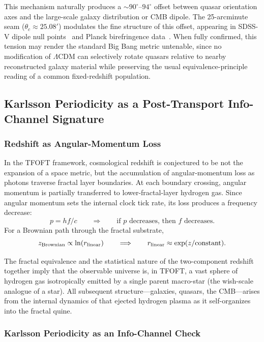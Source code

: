 \documentclass[11pt,a4paper]{article}
\begin{document}
This mechanism naturally produces a $\sim90^\circ$--$94^\circ$ offset between quasar orientation axes and the large-scale galaxy distribution or CMB dipole. The 25-arcminute seam ($\theta_c \approx 25.08'$) modulates the fine structure of this offset, appearing in SDSS-V dipole null points~\cite{Secrest2022,Secrest2025} and Planck birefringence data~\cite{Minami2020}. When fully confirmed, this tension may render the standard Big Bang metric untenable, since no modification of $\Lambda$CDM can selectively rotate quasars relative to nearby reconstructed galaxy material while preserving the usual equivalence-principle reading of a common fixed-redshift population.


\subsection{Karlsson Periodicity as a Post-Transport Info-Channel Signature}



\subsubsection{Redshift as Angular-Momentum Loss}

In the TFOFT framework, cosmological redshift is conjectured to be not the expansion of a space metric, but the accumulation of angular-momentum loss as photons traverse fractal layer boundaries. At each boundary crossing, angular momentum is partially transferred to lower-fractal-layer hydrogen gas. Since angular momentum sets the internal clock tick rate, its loss produces a frequency decrease:
\[
p = hf/c
\qquad\Longrightarrow\qquad
\text{if }p\text{ decreases, then }f\text{ decreases.}
\]
For a Brownian path through the fractal substrate,
\[
z_{\rm Brownian} \propto \ln(r_{\rm linear})
\qquad\Longrightarrow\qquad
r_{\rm linear} \approx \exp(z/\text{constant}).
\]

The fractal equivalence and the statistical nature of the two-component redshift together imply that the observable universe is, in TFOFT, a vast sphere of hydrogen gas isotropically emitted by a single parent macro-star (the wish-scale analogue of a star). All subsequent structure---galaxies, quasars, the CMB---arises from the internal dynamics of that ejected hydrogen plasma as it self-organizes into the fractal quine.

\subsubsection{Karlsson Periodicity as an Info-Channel Check}
\end{document}
